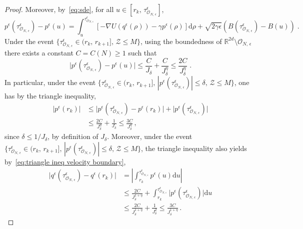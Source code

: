 \documentclass[10pt,a4paper]{amsart}
\newcommand{\R}{\mathbb{R}}
\begin{document}
\begin{proof}
Moreover, by~\eqref{eq:sde}, for all $u\in[r_{k},\,\tau_{\mathcal{O}_{N,\,\epsilon}}^{\epsilon}]$,
\[
p^{\epsilon}(\tau_{\mathcal{O}_{N,\,\epsilon}}^{\epsilon})-p^{\epsilon}(u)=\int_{u}^{\tau_{\mathcal{O}_{N,\,\epsilon}}^{\epsilon}}\left[-\nabla U(q^{\epsilon}(\rho))-\gamma p^{\epsilon}(\rho)\right]\mathrm{d}\rho+\sqrt{2\gamma\epsilon}\left(B(\tau_{\mathcal{O}_{N,\,\epsilon}}^{\epsilon})-B(u)\right)\;.
\]
Under the event $\{\tau_{\mathcal{O}_{N,\,\epsilon}}^{\epsilon}\in(r_{k},\,r_{k+1}],\,\mathcal{Z}\leq M\}$, using the boundedness of $\R^{2d}\setminus\mathcal{O}_{N,\,\epsilon}$ there exists a constant $C=C(N)\geq1$ such that
\begin{equation}\label{eq:triangle ineq velocity boundary}
\big|p^{\epsilon}(\tau_{\mathcal{O}_{N,\,\epsilon}}^{\epsilon})-p^{\epsilon}(u)\big|\leq\frac{C}{J_\delta}+\frac{C}{J_\delta^\eta}\leq \frac{2C}{J_\delta^\eta}\;.
\end{equation}
In particular, under the event $\{\tau_{\mathcal{O}_{N,\,\epsilon}}^{\epsilon}\in(r_{k},\,r_{k+1}],\,|p^{\epsilon}(\tau_{\mathcal{O}_{N,\,\epsilon}}^{\epsilon})|\leq\delta,\,\mathcal{Z}\leq M\}$, one has by the triangle inequality,
\begin{align}
\big|p^{\epsilon}(r_k)\big|&\leq\big|p^{\epsilon}(\tau_{\mathcal{O}_{N,\,\epsilon}}^{\epsilon})-p^{\epsilon}(r_k)\big|+\big|p^{\epsilon}(\tau_{\mathcal{O}_{N,\,\epsilon}}^{\epsilon})\big|\nonumber\\
&\leq\frac{2C}{J_\delta^\eta}+\frac{1}{J_\delta}\leq\frac{3C}{J_\delta^\eta}\label{eq:ineq triangl p}\,,
\end{align}
since $\delta\leq1/J_\delta$, by definition of $J_\delta$. Moreover, under the event $\{\tau_{\mathcal{O}_{N,\,\epsilon}}^{\epsilon}\in(r_{k},\,r_{k+1}],\,|p^{\epsilon}(\tau_{\mathcal{O}_{N,\,\epsilon}}^{\epsilon})|\leq\delta,\,\mathcal{Z}\leq M\}$, the triangle inequality also yields by~\eqref{eq:triangle ineq velocity boundary},
\begin{align}
\big|q^{\epsilon}(\tau_{\mathcal{O}_{N,\,\epsilon}}^{\epsilon})-q^{\epsilon}(r_{k})\big| & =\left|\int_{r_{k}}^{\tau_{\mathcal{O}_{N,\,\epsilon}}^{\epsilon}}p^{\epsilon}(u)\mathrm{d}u\right|\nonumber\\
&\leq \frac{2C}{J_\delta^{1+\eta}}+\int_{r_{k}}^{\tau_{\mathcal{O}_{N,\,\epsilon}}^{\epsilon}}\big|p^{\epsilon}(\tau_{\mathcal{O}_{N,\,\epsilon}}^{\epsilon})\big|\mathrm{d}u\nonumber\\ 
 &\leq\frac{2C}{J_\delta^{1+\eta}}+\frac{1}{J_\delta^{2}}\leq\frac{3C}{J_\delta^{1+\eta}}\label{eq:first triangle ineq}\,.

\end{align}
\end{proof}
\end{document}

